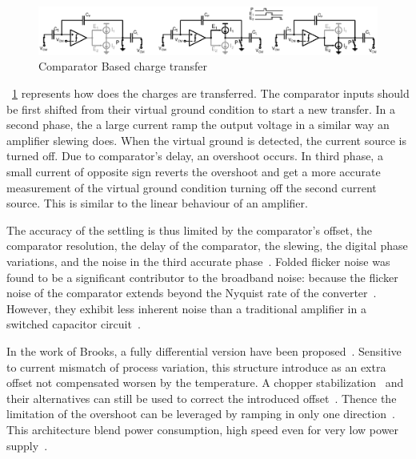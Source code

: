 \begin{figure}[htp]
	\centering
	\includegraphics[width=\textwidth]{Chapter3/Figs/algo_comp_based.ps}
	\caption{Comparator Based charge transfer}
	\label{fig:algo_comp_based}
\end{figure}

\figurename~\ref{fig:algo_comp_based} represents how does the charges are transferred. The comparator inputs should be first shifted from their virtual ground condition to start a new transfer. In a second phase, the a large current ramp the output voltage in a similar way an amplifier slewing does. When the virtual ground is detected, the current source is turned off. Due to comparator's delay, an overshoot occurs. In third phase, a small current of opposite sign reverts the overshoot and get a more accurate measurement of the virtual ground condition turning off the second current source. This is similar to the linear behaviour of an amplifier.

The accuracy of the settling is thus limited by the comparator's offset, the comparator resolution, the delay of the comparator, the slewing, the digital phase variations, and the noise in the third accurate phase~\cite{Fiorenza2006}.
Folded flicker noise was found to be a significant contributor to the broadband noise: because the flicker noise of the comparator extends beyond the Nyquist rate of the converter~\cite{Sepke2008}. However, they exhibit less inherent noise than a traditional amplifier in a switched capacitor circuit~\cite{Fiorenza2006}.

In the work of Brooks, a fully differential version have been proposed~\cite{Brooks2009}. Sensitive to current mismatch of process variation, this structure introduce as an extra offset not compensated worsen by the temperature. A chopper stabilization~\cite{Toth2003} and their alternatives can still be used to correct the introduced offset~\cite{Brooks2009}.
Thence the limitation of the overshoot can be leveraged by ramping in only one direction~\cite{Lee2012}. This architecture blend power consumption, high speed even for very low power supply~\cite{Steyaert2012}.

